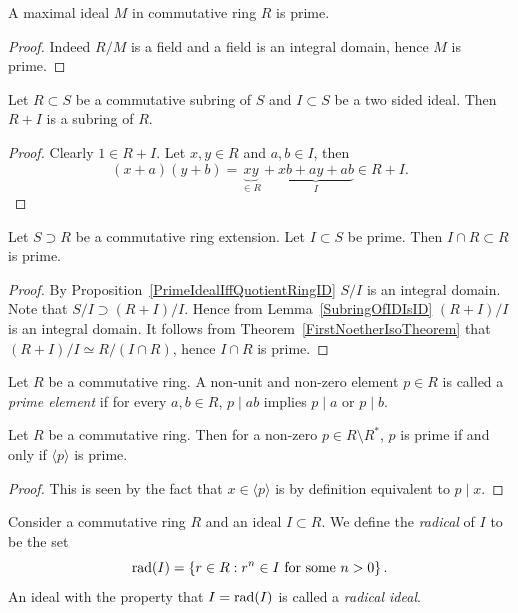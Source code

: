 \begin{corollary}
    A maximal ideal $M$ in commutative ring $R$ is prime.
\end{corollary}
\begin{proof}
    Indeed $R/M$ is a field and a field is an integral domain, hence $M$ is prime.
\end{proof}
\begin{lemma}
    Let $R\subset S$ be a commutative subring of $S$ and $I\subset S$ be a two sided ideal. Then $R+I$ is a subring of $R$.
\end{lemma}
\begin{proof}
    Clearly $1\in R+I$. Let $x,y\in R$ and $a,b\in I$, then 
    $$
        (x+a)(y+b)= \underbrace{xy}_{\in R}+\underbrace{xb+ay+ab}_{I}\in R+I.
    $$
\end{proof}
\begin{proposition}\label{EliminationIdealOfPrimeIdealIsPrime}
    Let $S\supset R$ be a commutative ring extension. Let $I\subset S$ be prime. Then $I\cap R\subset R$ is prime.  
\end{proposition}
\begin{proof}
    By Proposition~\ref{PrimeIdealIffQuotientRingID} $S/I$ is an integral domain. Note that $S/I\supset (R+I)/I$. Hence from Lemma~\ref{SubringOfIDIsID} $(R+I)/I$ is an integral domain. It follows from Theorem~\ref{FirstNoetherIsoTheorem} that $(R+I)/I\simeq R/(I\cap R)$, hence $I\cap R$ is prime.
\end{proof}
\begin{definition}
    Let $R$ be a commutative ring. A non-unit and non-zero element $p \in R$ is called a \textit{prime element} if for every $a,b\in R$, $p\mid ab$ implies $p\mid a$ or $p\mid b$. 
\end{definition}
\begin{lemma}\label{PrimeElementsGeneratePrimeIdeals}
    Let $R$ be a commutative ring. Then for a non-zero $p\in R\setminus R^\ast$, $p$ is prime if and only if $\langle p \rangle$ is prime.
\end{lemma}
\begin{proof}
    This is seen by the fact that $x \in \langle p\rangle $ is by definition equivalent to $p\mid x$. 
\end{proof}
\begin{definition}
    Consider a commutative ring $R$ and an ideal $I \subset R$. We define the \textit{radical} of $I$ to be the set
    $$\mathrm{rad}(I)= \left\{ r\in R : r^n\in I \text{ for some } n>0 \right\}.$$
    An ideal with the property that $I = \mathrm{rad}(I)$ is called a \textit{radical ideal}. 
\end{definition}

